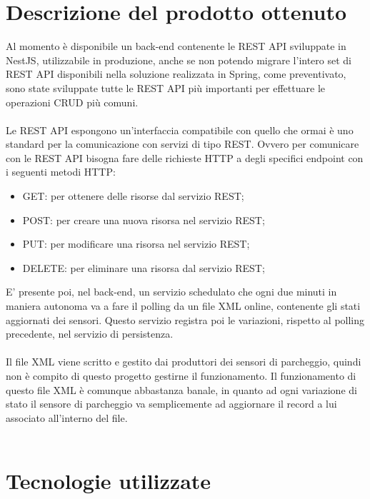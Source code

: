 \section{Descrizione del prodotto ottenuto}

Al momento è disponibile un back-end contenente le REST API sviluppate in NestJS, utilizzabile in produzione,
anche se non potendo migrare l'intero set di REST API disponibili nella soluzione realizzata in Spring, come preventivato,
sono state sviluppate tutte le REST API più importanti per effettuare le operazioni CRUD più
comuni.
\\\\
Le REST API espongono un'interfaccia compatibile con quello che ormai è uno standard per la
comunicazione con servizi di tipo REST. Ovvero per comunicare con le REST API bisogna fare
delle richieste HTTP a degli specifici endpoint con i seguenti metodi HTTP:
\begin{itemize}
    \item GET: per ottenere delle risorse dal servizio REST;
    \item POST: per creare una nuova risorsa nel servizio REST;
    \item PUT: per modificare una risorsa nel servizio REST;
    \item DELETE: per eliminare una risorsa dal servizio REST;
\end{itemize}
\leavevmode\newline
E' presente poi, nel back-end, un servizio schedulato che ogni due minuti in maniera autonoma va a fare il polling
da un file XML online, contenente gli stati aggiornati dei sensori. Questo servizio registra poi 
le variazioni, rispetto
al polling precedente, nel servizio di persistenza.
\\\\
Il file XML viene scritto e gestito dai produttori dei sensori di parcheggio, quindi non è compito di questo 
progetto gestirne il funzionamento. Il funzionamento di questo file XML è comunque abbastanza banale,
in quanto ad ogni variazione di stato il sensore di parcheggio va semplicemente ad aggiornare 
il record a lui associato
all'interno del file.
\\\\

\section{Tecnologie utilizzate}

